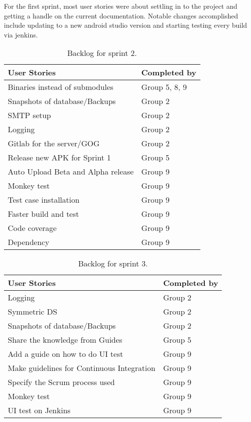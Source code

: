 For the first sprint, most user stories were about settling in to the project and getting a handle on the current documentation. Notable changes accomplished include updating to a new android studio version and starting testing every build via jenkins.

\begin{table}
	\centering
	\begin{tabular}{ll}
		\textbf{User Stories} & \textbf{Completed by}\\ \hline \noalign{\vskip 2mm}
		Binaries instead of submodules & Group 5, 8, 9\\ \hline
		Snapshots of database/Backups & Group 2\\ \hline
		SMTP setup & Group 2\\ \hline
		Logging & Group 2\\ \hline
		Gitlab for the server/GOG & Group 2\\ \hline
		Release new APK for Sprint 1 & Group 5\\ \hline
		Auto Upload Beta and Alpha release & Group 9\\ \hline
		Monkey test & Group 9\\ \hline
		Test case installation & Group 9\\ \hline
		Faster build and test & Group 9\\ \hline
		Code coverage & Group 9\\ \hline
		Dependency & Group 9\\ \hline
	\end{tabular}
	\caption{Backlog for sprint 2.}
	\label{Roles_ReleaseBacklogSprint2_table}
\end{table}

\begin{table}
	\centering
	\begin{tabular}{ll}
		\textbf{User Stories} & \textbf{Completed by}\\ \hline \noalign{\vskip 2mm}
		Logging & Group 2\\ \hline
		Symmetric DS & Group 2\\ \hline
		Snapshots of database/Backups & Group 2\\ \hline
		Share the knowledge from Guides & Group 5\\ \hline
		Add a guide on how to do UI test & Group 9\\ \hline
		Make guidelines for Continuous Integration & Group 9\\ \hline
		Specify the Scrum process used & Group 9\\ \hline
		Monkey test & Group 9\\ \hline
		UI test on Jenkins & Group 9\\ \hline
	\end{tabular}
	\caption{Backlog for sprint 3.}
	\label{Roles_ReleaseBacklogSprint3_table}
\end{table}